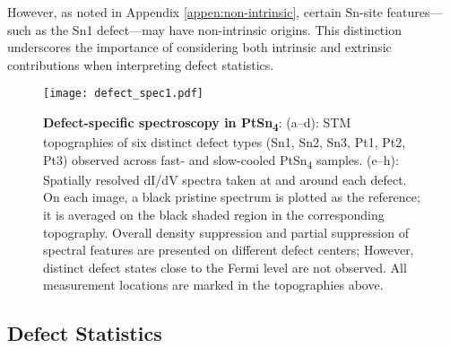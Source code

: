 However, as noted in Appendix \ref{appen:non-intrinsic}, certain Sn-site features—such as the Sn1 defect—may have non-intrinsic origins. This distinction underscores the importance of considering both intrinsic and extrinsic contributions when interpreting defect statistics.

\begin{figure}
	\centering
	\texttt{[image: defect\_spec1.pdf]}
	\caption[\textbf{Defect-specific spectroscopy in PtSn\textsubscript{4}}]{\textbf{Defect-specific spectroscopy in PtSn\textsubscript{4}}:
		(a–d): STM topographies of six distinct defect types (Sn1, Sn2, Sn3, Pt1, Pt2, Pt3) observed across fast- and slow-cooled PtSn\textsubscript{4} samples.
		(e–h): Spatially resolved dI/dV spectra taken at and around each defect. On each image, a black pristine spectrum is plotted as the reference; it is averaged on the black shaded region in the corresponding topography. Overall density suppression and partial suppression of spectral features are presented on different defect centers; However, distinct defect states close to the Fermi level are not observed. All measurement locations are marked in the topographies above.}
	\label{fig:defect_spectro}
\end{figure}

\subsection{Defect Statistics}

